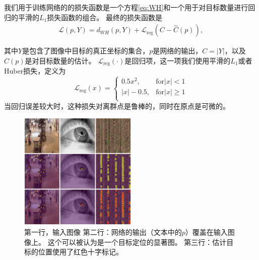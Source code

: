 \documentclass[10pt,twocolumn,letterpaper,UTF8]{article}
\begin{document}
我们用于训练网络的的损失函数是一个方程\eqref{eq:WH}和一个用于对目标数量进行回归的平滑的$L_1$损失函数的组合。
最终的损失函数是
\begin{equation}
  \label{eq:loss}
\begin{split}
    \mathcal{L}(p, Y) = d_{WH}(p, Y) + \mathcal{L}_{\text{reg}}(C - \hat{C}(p)),
 \end{split}
\end{equation}

其中$Y$是包含了图像中目标的真正坐标的集合，$p$是网络的输出，$C = |Y|$，以及$\hat{C}(p)$是对目标数量的估计。
$\mathcal{L}_{\text{reg}}(\cdot)$是回归项，这一项我们使用平滑的$L_1$或者Huber损失\cite{huber1964}，定义为
\begin{equation}
    \mathcal{L}_{\text{reg}}(x) =
    \begin{cases}
        0.5x^2,& \text{for} |x| < 1 \\
        |x| - 0.5,& \text{for} |x| \geq 1 \\
   \end{cases}
\end{equation}
当回归误差较大时，这种损失对离群点是鲁棒的，同时在原点是可微的。

\begin{figure}[t]
\begin{center}
   \includegraphics[width=0.5\textwidth]{fig/results/collage3x3.png}
\end{center}
   \caption{
            第一行，输入图像
            第二行：网络的输出（文本中的$p$）覆盖在输入图像上。
            这个可以被认为是一个目标定位的显著图。
            第三行：估计目标的位置使用了红色十字标记。}
\label{fig:collage_clusters}
\end{figure}
\end{document}
